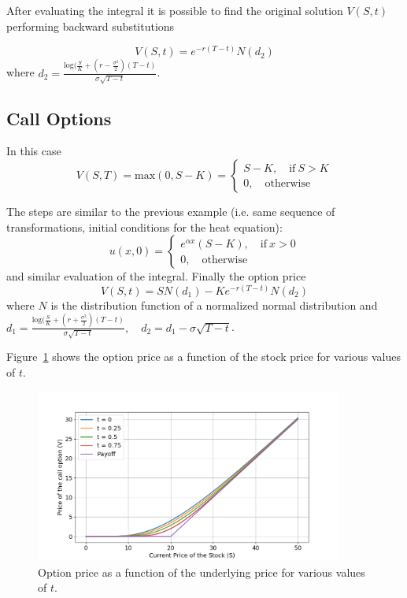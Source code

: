After evaluating the integral it is possible to find the original solution $V(S,t)$ performing backward substitutions

\begin{equation}
V(S, t) = e^{-r(T-t)}N(d_2)
\end{equation}
where $d_2=\frac{\textrm{log}(\frac{S}{K}+\left(r-\frac{\sigma^2}{2}\right)(T-t)}{\sigma\sqrt{T-t}}$.

\subsection{Call Options}
In this case
\begin{equation}
V(S,T)=\textrm{max}(0,S-K)=
\begin{cases}
S-K,\quad \textrm{if}~S>K\\
0, \quad\textrm{otherwise}
\end{cases}
\end{equation}

The steps are similar to the previous example (i.e. same sequence of transformations, initial conditions for the heat equation):
\begin{equation}
u(x,0)=
\begin{cases}
e^{\alpha x}(S-K),\quad \textrm{if}~x>0\\
0, \quad\textrm{otherwise}
\end{cases}
\end{equation}
and similar evaluation of the integral. Finally the option price
\begin{equation}
V(S,t) = SN(d_1)-Ke^{-r(T-t)}N(d_2)
\end{equation}
where $N$ is the distribution function of a normalized normal distribution and  $d_1=\frac{\textrm{log}(\frac{S}{K}+\left(r+\frac{\sigma^2}{2}\right)(T-t)}{\sigma\sqrt{T-t}},\quad d_2=d_1-\sigma\sqrt{T-t}$.

Figure~\ref{fig:call_option} shows the option price as a function of the stock price for various values of $t$.

\begin{figure}[htb]
  \centering
  \includegraphics[width=0.9\textwidth]{figures/call_option_price}
  \caption{Option price as a function of the underlying price for various values of $t$.}
  \label{fig:call_option}
\end{figure}

